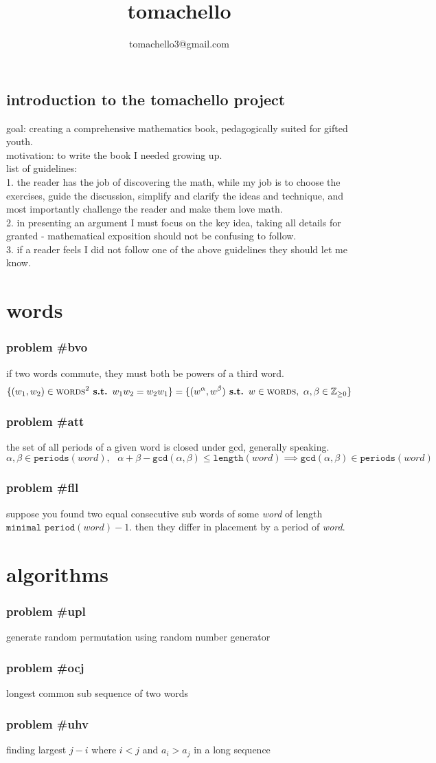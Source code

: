 \documentclass{article}
\title{tomachello}
\author{tomachello3@gmail.com}
\date{}
\newcommand{\st}{\textbf{ s.t. }}
\newcommand{\SP}{\text{ }}
\newcommand{\problem}[1]{\subsubsection*{\textbf{problem \##1}}}
\newcommand{\chapter}[1]{\section*{#1}}
\newcommand{\Zpf}{\mathbb{Z}_{\ge0}}
\newcommand{\CST}[1]{\textsc{#1}}
\newcommand{\FNC}[1]{\texttt{#1}}
\newcommand{\VAR}[1]{\textit{#1}}
\begin{document}
\maketitle

\subsection*{introduction to the tomachello project}
goal: creating a comprehensive mathematics book, pedagogically suited for gifted youth.\\
motivation: to write the book I needed growing up.\\
list of guidelines:\\
1. the reader has the job of discovering the math, while my job is to choose the exercises, guide the discussion, simplify and clarify the ideas and technique, and most importantly challenge the reader and make them love math.\\
2. in presenting an argument I must focus on the key idea, taking all details for granted - mathematical exposition should not be confusing to follow.\\
3. if a reader feels I did not follow one of the above guidelines they should let me know.
\chapter{words}
\problem{bvo} if two words commute, they must both be powers of a third word. 
$$\{(w_1,w_2)\in \CST{words}^2 \st w_1w_2=w_2w_1\}=\{(w^\alpha,w^\beta)\st w\in\CST{words},\SP\alpha,\beta\in\Zpf\}$$
\problem{att} the set of all periods of a given word is closed under gcd, generally speaking.
$$\alpha,\beta\in \FNC{periods}(\VAR{word}), \SP\alpha+\beta-\FNC{gcd}(\alpha,\beta)\le \FNC{length}(\VAR{word})\implies \FNC{gcd}(\alpha,\beta)\in\FNC{periods}(\VAR{word})$$
\problem{fll} suppose you found two equal consecutive sub words of some \VAR{word} of length $\FNC{minimal period}(\VAR{word})-1$. then they differ in placement by a period of \VAR{word}.
\chapter{algorithms}
\problem{upl} generate random permutation using random number generator
\problem{ocj} longest common sub sequence of two words
\problem{uhv} finding largest $j-i$ where $i<j$ and $a_i>a_j$ in a long sequence
\end{document}
